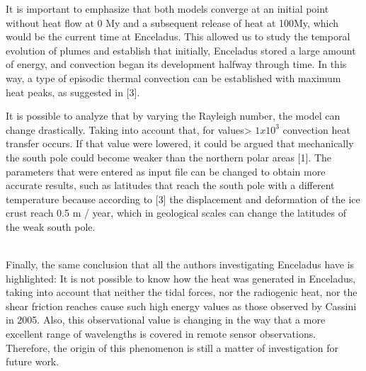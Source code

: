 \documentclass[../main.tex]{subfiles}
\begin{document}
It is important to emphasize that both models converge at an initial point without heat flow at 0 My and a subsequent release of heat at 100My, which would be the current time at Enceladus. This allowed us to study the temporal evolution of plumes and establish that initially, Enceladus stored a large amount of energy, and convection began its development halfway through time. In this way, a type of episodic thermal convection can be established with maximum heat peaks, as suggested in [3].



It is possible to analyze that by varying the Rayleigh number, the model can change drastically. Taking into account that, for values> $ 1x10 ^ {3} $ convection heat transfer occurs. If that value were lowered, it could be argued that mechanically the south pole could become weaker than the northern polar areas [1]. The parameters that were entered as input file can be changed to obtain more accurate results, such as latitudes that reach the south pole with a different temperature because according to [3] the displacement and deformation of the ice crust reach 0.5 m / year, which in geological scales can change the latitudes of the weak south pole.\\\


Finally, the same conclusion that all the authors investigating Enceladus have is highlighted: It is not possible to know how the heat was generated in Enceladus, taking into account that neither the tidal forces, nor the radiogenic heat, nor the shear friction reaches cause such high energy values as those observed by Cassini in 2005. Also, this observational value is changing in the way that a more excellent range of wavelengths is covered in remote sensor observations. Therefore, the origin of this phenomenon is still a matter of investigation for future work.
\end{document}
